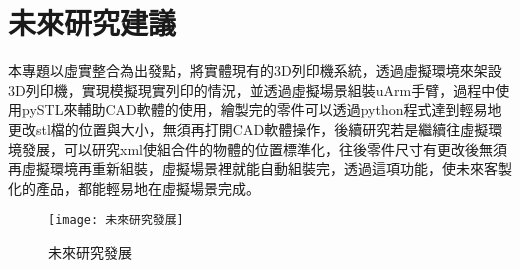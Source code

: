 \chapter{未來研究建議}
本專題以虛實整合為出發點，將實體現有的3D列印機系統，透過虛擬環境來架設3D列印機，實現模擬現實列印的情況，並透過虛擬場景組裝uArm手臂，過程中使用pySTL來輔助CAD軟體的使用，繪製完的零件可以透過python程式達到輕易地更改stl檔的位置與大小，無須再打開CAD軟體操作，後續研究若是繼續往虛擬環境發展，可以研究xml使組合件的物體的位置標準化，往後零件尺寸有更改後無須再虛擬環境再重新組裝，虛擬場景裡就能自動組裝完，透過這項功能，使未來客製化的產品，都能輕易地在虛擬場景完成。 \\


\begin{figure}[hbt!]
\begin{center}
\texttt{[image: 未來研究發展]}
\caption{\Large 未來研究發展}\label{未來研究發展}
\end{center}
\end{figure}
